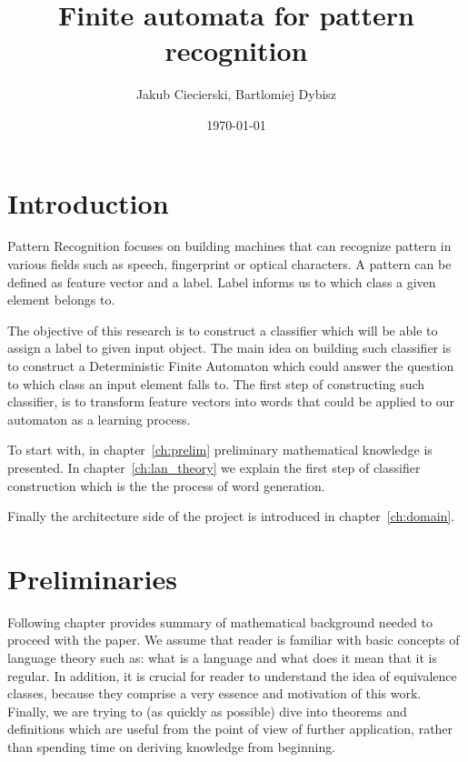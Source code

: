 \documentclass{mini}
\title{Finite automata for pattern recognition}
\author{Jakub Ciecierski, Bartlomiej Dybisz}
\date{\today}
\begin{document}
\maketitle
\tableofcontents

\chapter*{Introduction}

Pattern Recognition focuses on building machines that can recognize pattern in various fields such as speech, fingerprint or optical characters. A pattern can be defined as feature vector and a label. Label informs us to which class a given element belongs to.

The objective of this research is to construct a classifier which will be able to assign a label to given input object. The main idea on building such classifier is to construct a Deterministic Finite Automaton which could answer the question to which class an input element falls to. The first step of constructing such classifier, is to transform feature vectors into words that could be applied to our automaton as a learning process.

To start with, in chapter~\ref{ch:prelim} preliminary mathematical knowledge is presented. In chapter~\ref{ch:lan_theory} we explain the first step of classifier construction which is the the process of word generation.

Finally the architecture side of the project is introduced in chapter~\ref{ch:domain}.

\chapter{Preliminaries}\label{chap:prelim}
Following chapter provides summary of mathematical background needed to proceed with the paper. We assume that reader is familiar with basic concepts of language theory such as: what is a language and what does it mean that it is regular. In addition, it is crucial for reader to understand the idea of equivalence classes, because they comprise a very essence and motivation of this work. Finally, we are trying to (as quickly as possible) dive into theorems and definitions which are useful from the point of view of further application, rather than spending time on deriving knowledge from beginning.
\end{document}
